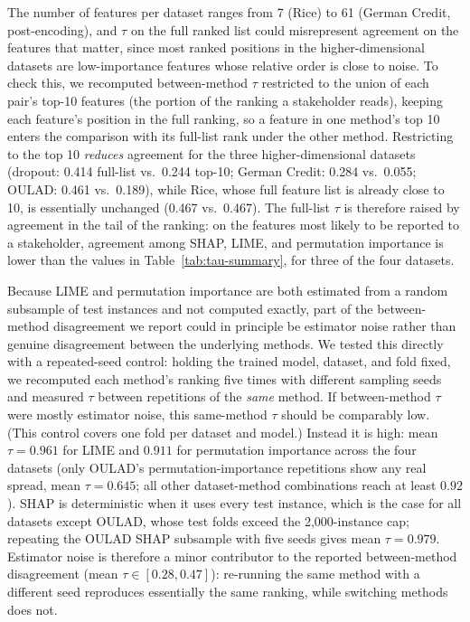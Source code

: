 \documentclass[11pt,twoside,a4paper]{article}
\begin{document}
The number of features per dataset ranges from 7 (Rice) to 61 (German Credit, post-encoding), and $\tau$ on the full ranked list could misrepresent agreement on the features that matter, since most ranked positions in the higher-dimensional datasets are low-importance features whose relative order is close to noise. To check this, we recomputed between-method $\tau$ restricted to the union of each pair's top-10 features (the portion of the ranking a stakeholder reads), keeping each feature's position in the full ranking, so a feature in one method's top 10 enters the comparison with its full-list rank under the other method. Restricting to the top 10 \emph{reduces} agreement for the three higher-dimensional datasets (dropout: 0.414 full-list vs.\ 0.244 top-10; German Credit: 0.284 vs.\ 0.055; OULAD: 0.461 vs.\ 0.189), while Rice, whose full feature list is already close to 10, is essentially unchanged (0.467 vs.\ 0.467). The full-list $\tau$ is therefore raised by agreement in the tail of the ranking: on the features most likely to be reported to a stakeholder, agreement among SHAP, LIME, and permutation importance is lower than the values in Table~\ref{tab:tau-summary}, for three of the four datasets.

Because LIME and permutation importance are both estimated from a random subsample of test instances and not computed exactly, part of the between-method disagreement we report could in principle be estimator noise rather than genuine disagreement between the underlying methods. We tested this directly with a repeated-seed control: holding the trained model, dataset, and fold fixed, we recomputed each method's ranking five times with different sampling seeds and measured $\tau$ between repetitions of the \emph{same} method. If between-method $\tau$ were mostly estimator noise, this same-method $\tau$ should be comparably low. (This control covers one fold per dataset and model.) Instead it is high: mean $\tau=0.961$ for LIME and $0.911$ for permutation importance across the four datasets (only OULAD's permutation-importance repetitions show any real spread, mean $\tau=0.645$; all other dataset-method combinations reach at least $0.92$). SHAP is deterministic when it uses every test instance, which is the case for all datasets except OULAD, whose test folds exceed the 2{,}000-instance cap; repeating the OULAD SHAP subsample with five seeds gives mean $\tau=0.979$. Estimator noise is therefore a minor contributor to the reported between-method disagreement (mean $\tau \in [0.28, 0.47]$): re-running the same method with a different seed reproduces essentially the same ranking, while switching methods does not.
\end{document}
